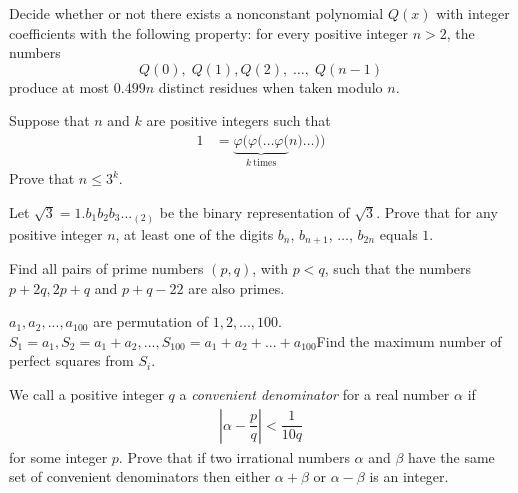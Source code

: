 \documentclass[problems.tex]{subfile}
\begin{document}
	\begin{problem}
		Decide whether or not there exists a nonconstant polynomial $Q(x)$ with integer coefficients with the following property: for every positive integer $n > 2$, the numbers \[ Q(0), \; Q(1), Q(2), \; \dots, \; Q(n-1) \]produce at most $0.499n$ distinct residues when taken modulo $n$. %
	\end{problem}

	\begin{problem}
		Suppose that $n$ and $k$ are positive integers such that
			\begin{align*}
				1
					& = \underbrace{\varphi( \varphi( \dots \varphi(}_{k\ \text{times}} n) \dots ))
			\end{align*}
		Prove that $n \le 3^k$. %
	\end{problem}

	\begin{problem}
		Let $\sqrt 3 = 1.b_1b_2b_3 \dots _{(2)}$ be the binary representation of $\sqrt 3$. Prove that for any positive integer $n$, at least one of the digits $b_n$, $b_{n+1}$, $\dots$, $b_{2n}$ equals $1$. %
	\end{problem}

	\begin{problem}
		Find all pairs of prime numbers $(p, q)$, with $p <q$, such that the numbers $p + 2q, 2p + q$ and $p + q - 22$ are also primes.
	\end{problem}

	\begin{problem}
		$a_1,a_2,...,a_{100}$ are permutation of $1,2,...,100$. $S_1=a_1, S_2=a_1+a_2,...,S_{100}=a_1+a_2+...+a_{100}$Find the maximum number of perfect squares from $S_i$. %
	\end{problem}

	\begin{problem}
		We call a positive integer $q$ a \textit{convenient denominator} for a real number $\alpha$ if
			\begin{align*}
				\left|\alpha - \dfrac{p}{q}\right|<\dfrac{1}{10q}
			\end{align*}
		for some integer $p$. Prove that if two irrational numbers $\alpha$ and
		$\beta$ have the same set of convenient denominators then either $\alpha+\beta$ or $\alpha- \beta$ is an integer\watermark. %
	\end{problem}
\end{document}
